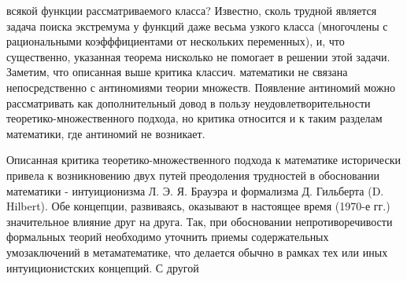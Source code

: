 \documentclass[10pt]{article}
\begin{document}
всякой функции рассматриваемого класса? Известно, сколь трудной является задача поиска экстремума у функций даже весьма узкого класса (многочлены с рациональными коэфффициентами от нескольких переменных), и, что существенно, указанная теорема нисколько не помогает в решении этой задачи. Заметим, что описанная выше критика классич. математики не связана непосредственно с антиномиями теории множеств. Появление антиномий можно рассматривать как дополнительный довод в пользу неудовлетворительности теоретико-множественного подхода, но критика относится и к таким разделам математики, где антиномий не возникает.



Описанная критика теоретико-множественного подхода к математике исторически привела к возникновению двух путей преодоления трудностей в обосновании математики - интуиционизма Л. Э. Я. Брауэра и формализма Д. Гильберта (D. Hilbert). Обе концепции, развиваясь, оказывают в настоящее время (1970-е гг.) значительное влияние друг на друга. Так, при обосновании непротиворечивости формальных теорий необходимо уточнить приемы содержательных умозаключений в метаматематике, что делается обычно в рамках тех или иных интуиционистских концепций. С другой
\end{document}
